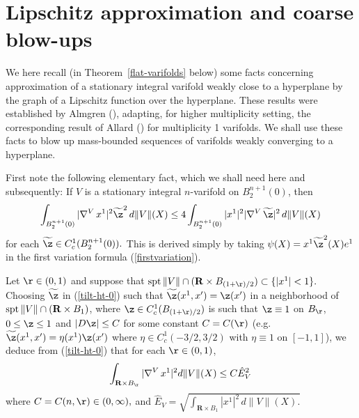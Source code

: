 \documentclass[a4paper,11pt]{amsart}
\begin{document}
\section{Lipschitz approximation and coarse blow-ups}\label{blow-up}
\setcounter{equation}{0}

We here recall (in Theorem~\ref{flat-varifolds} below) some facts concerning approximation of a stationary integral varifold weakly close to a hyperplane by the graph of a Lipschitz function over the hyperplane. These results were established by Almgren (\cite{A}), adapting, for higher multiplicity setting, the corresponding result of Allard (\cite{AW}) for multiplicity 1 varifolds. We shall use these facts to blow up mass-bounded sequences of varifolds weakly converging to a hyperplane. 



First note the following elementary fact, which we shall need here and subsequently: If $V$ is a stationary integral $n$-varifold on 
$B_{2}^{n+1}(0)$, then 
\begin{equation}\label{tilt-ht-0}
\int_{B_{2}^{n+1}(0)} |\nabla^{V} \, x^{1}|^{2} \widetilde{\z}^{2} \,  d\|V\|(X) \leq 4\int_{B_{2}^{n+1}(0)}|x^{1}|^{2}|\nabla^{V} \, \widetilde{\z}|^{2} \, d\|V\|(X)
\end{equation}
for each $\widetilde{\z} \in C^{1}_{c}(B_{2}^{n+1}(0)).$ This is derived simply by taking $\psi(X) = x^{1}{\widetilde \z}^{2}(X)e^{1}$ in the first variation formula (\ref{firstvariation}). 

Let $\r \in (0, 1)$ and suppose that ${\rm spt} \, \|V\| \cap ({\mathbf R} \times B_{(1+\r)/2}) \subset \{|x^{1}| < 1\}.$ Choosing $\widetilde{\z}$ in (\ref{tilt-ht-0}) such that $\widetilde{\z}(x^{1}, x^{\prime})  = \z(x^{\prime})$ in a neighborhood of ${\rm spt} \, \|V\| \cap ({\mathbf R} \times B_{1})$, where 
$\z \in C^{1}_{c}(B_{(1+\r)/2})$ is such that $\z \equiv 1$ on $B_{\r}$, $0 \leq \z \leq 1$ and $|D\z| \leq C$ for some constant $C = C(\r)$ (e.g.\ $\widetilde{\z}(x^{1}, x^{\prime})  = \eta(x^{1})\z(x^{\prime})$ where $\eta \in C^{1}_{c}(-3/2, 3/2)$ with $\eta \equiv 1$ on $[-1, 1]$), we deduce from (\ref{tilt-ht-0}) that for each $\r \in (0, 1)$, 
\begin{equation}\label{tilt-ht}
\int_{{\mathbf R} \times B_{\r}} |\nabla^{V} \, x^{1}|^{2} d\|V\|(X) \leq C{\hat E}_{V}^{2}
\end{equation}
where $C = C(n, \r) \in (0, \infty),$ and ${\hat E}_{V} = \sqrt{\int_{{\mathbf R} \times B_{1}} |x^{1}|^{2} \, d\|V\|(X).}$
\end{document}
